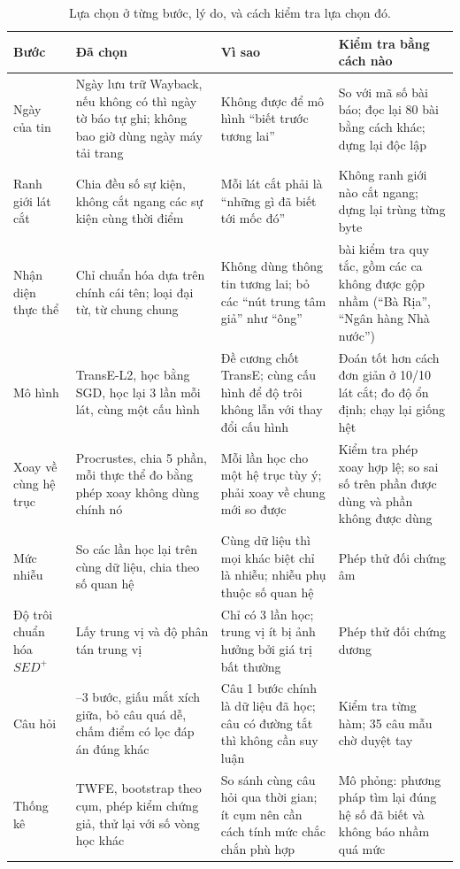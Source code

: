 \begin{table}[htbp]
\centering
\caption{Lựa chọn ở từng bước, lý do, và cách kiểm tra lựa chọn đó.}
\label{tab:design_rationale}
\footnotesize
\begin{tabularx}{\textwidth}{>{\raggedright\arraybackslash}p{2.1cm}>{\raggedright\arraybackslash}X>{\raggedright\arraybackslash}X>{\raggedright\arraybackslash}X}
\toprule
\textbf{Bước} & \textbf{Đã chọn} & \textbf{Vì sao} & \textbf{Kiểm tra bằng cách nào} \\
\midrule
Ngày của tin & Ngày lưu trữ Wayback, nếu không có thì ngày tờ báo tự ghi; không bao giờ dùng ngày máy tải trang & Không được để mô hình ``biết trước tương lai'' & So với mã số bài báo; đọc lại 80 bài bằng cách khác; dựng lại độc lập \\
Ranh giới lát cắt & Chia đều số sự kiện, không cắt ngang các sự kiện cùng thời điểm & Mỗi lát cắt phải là ``những gì đã biết tới mốc đó'' & Không ranh giới nào cắt ngang; dựng lại trùng từng byte \\
Nhận diện thực thể & Chỉ chuẩn hóa dựa trên chính cái tên; loại đại từ, từ chung chung & Không dùng thông tin tương lai; bỏ các ``nút trung tâm giả'' như ``ông'' & 38 bài kiểm tra quy tắc, gồm các ca không được gộp nhầm (``Bà Rịa'', ``Ngân hàng Nhà nước'') \\
Mô hình & TransE-L2, học bằng SGD, học lại 3 lần mỗi lát, cùng một cấu hình & Đề cương chốt TransE; cùng cấu hình để độ trôi không lẫn với thay đổi cấu hình & Đoán tốt hơn cách đơn giản ở 10/10 lát cắt; đo độ ổn định; chạy lại giống hệt \\
Xoay về cùng hệ trục & Procrustes, chia 5 phần, mỗi thực thể đo bằng phép xoay không dùng chính nó & Mỗi lần học cho một hệ trục tùy ý; phải xoay về chung mới so được & Kiểm tra phép xoay hợp lệ; so sai số trên phần được dùng và phần không được dùng \\
Mức nhiễu & So các lần học lại trên cùng dữ liệu, chia theo số quan hệ & Cùng dữ liệu thì mọi khác biệt chỉ là nhiễu; nhiễu phụ thuộc số quan hệ & Phép thử đối chứng âm \\
Độ trôi chuẩn hóa $SED^+$ & Lấy trung vị và độ phân tán trung vị & Chỉ có 3 lần học; trung vị ít bị ảnh hưởng bởi giá trị bất thường & Phép thử đối chứng dương \\
Câu hỏi & 2--3 bước, giấu mắt xích giữa, bỏ câu quá dễ, chấm điểm có lọc đáp án đúng khác & Câu 1 bước chính là dữ liệu đã học; câu có đường tắt thì không cần suy luận & Kiểm tra từng hàm; 35 câu mẫu chờ duyệt tay \\
Thống kê & TWFE, bootstrap theo cụm, phép kiểm chứng giả, thử lại với số vòng học khác & So sánh cùng câu hỏi qua thời gian; ít cụm nên cần cách tính mức chắc chắn phù hợp & Mô phỏng: phương pháp tìm lại đúng hệ số đã biết và không báo nhầm quá mức \\
\bottomrule
\end{tabularx}
\end{table}

